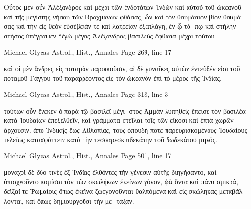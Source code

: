 \documentclass[12pt,letterpaper,twoside,final]{memoir}
\begin{document}
\begin{greek}
Οὗτος μὲν οὖν Ἀλέξανδρος καὶ μέχρι τῶν ἐνδοτάτων 
Ἰνδῶν καὶ αὐτοῦ τοῦ ὠκεανοῦ καὶ τῆς μεγίστης νήσου τῶν 
Βραχμάνων φθάσας, ὧν καὶ τὸν θαυμάσιον βίον θαυμάσας καὶ 
τὴν εἰς θεὸν εὐσέβειάν τε καὶ λατρείαν ἐξεπλάγη, ἐν ᾧ τό-
πῳ καὶ στήλην στήσας ὑπέγραψεν “ἐγὼ μέγας Ἀλέξανδρος 
βασιλεὺς ἔφθασα μέχρι τούτου. 



Michael Glycas Astrol., Hist., Annales 
Page 269, line 17

                                           καὶ οἱ μὲν ἄνδρες εἰς 
ποταμὸν παροικοῦσιν, αἱ δὲ γυναῖκες αὐτῶν ἐντεῦθέν εἰσι 
τοῦ ποταμοῦ Γάγγου τοῦ παραρρέοντος εἰς τὸν ὠκεανὸν ἐπὶ 
τὸ μέρος τῆς Ἰνδίας. 



Michael Glycas Astrol., Hist., Annales 
Page 318, line 3

                 τούτων οὖν ἕνεκεν ὁ παρὰ τῷ βασιλεῖ μέγι-  
στος Ἀμμὰν λυπηθεὶς ἔπεισε τὸν βασιλέα κατὰ Ἰουδαίων 
ἐπεξελθεῖν, καὶ γράμματα στεῖλαι τοῖς τῶν εἴκοσι καὶ ἑπτὰ 
χωρῶν ἄρχουσιν, ἀπὸ Ἰνδικῆς ἕως Αἰθιοπίας, τοὺς ὁπουδή 
ποτε παρευρισκομένους Ἰουδαίους τελείως κατασφάττειν κατὰ 
τὴν τεσσαρεσκαιδεκάτην τοῦ δωδεκάτου μηνός. 



Michael Glycas Astrol., Hist., Annales 
Page 501, line 17

                μοναχοὶ δὲ δύο τινὲς ἐξ Ἰνδίας ἐλθόντες τὴν 
γένεσιν αὐτῆς διηγήσαντο, καὶ ὑπισχνοῦντο κομίσαι τὸν τῶν 
σκωλήκων ἐκείνων γόνον, ᾠὰ ὄντα καὶ πάνυ σμικρά, δεῖξαί 
τε Ῥωμαίοις ὅπως ἐκεῖνα ζωογονοῦνται θαλπόμενα καὶ εἰς 
σκώληκας μεταβάλλονται, καὶ ὅπως δημιουργοῦσι τὴν με-  
τάξαν. 

\end{greek}
\end{document}
